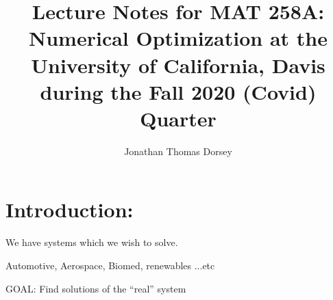 \documentclass[a4paper, twocolumn, 12 pt]{article}
\begin{document}
\title{Lecture Notes for MAT 258A: Numerical Optimization at the University of California, Davis during the Fall 2020 (Covid) Quarter}
\author{ Jonathan Thomas Dorsey}


\maketitle{}

\section{Introduction:}


We have systems which we wish to solve.

Automotive, Aerospace, Biomed, renewables ...etc


GOAL: Find solutions of the ``real'' system
\end{document}
